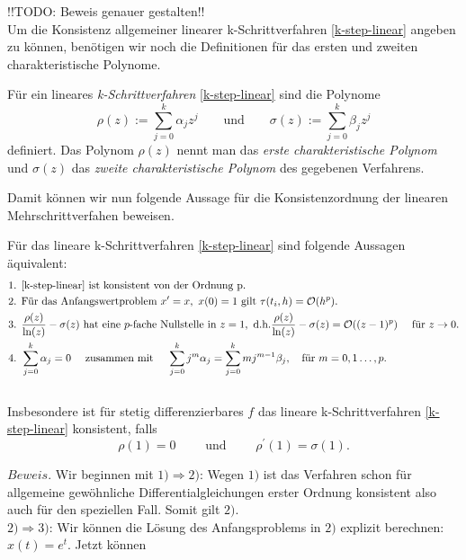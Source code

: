 !!TODO: Beweis genauer gestalten!!\\
Um die Konsistenz allgemeiner linearer k-Schrittverfahren \eqref{k-step-linear} angeben zu können, benötigen wir noch
die Definitionen für das ersten und zweiten charakteristische Polynome.
\begin{definition}
    Für ein lineares \textit{k-Schrittverfahren} \eqref{k-step-linear} sind die Polynome
    \[
        \rho(z) := \sum_{j=0}^{k} \alpha_j z^j \qquad \text{und} \qquad \sigma(z) := \sum_{j=0}^{k} \beta_j z^j
    \]
    definiert. Das Polynom $\rho(z)$ nennt man das {\em erste charakteristische Polynom} und $\sigma(z)$ das
    {\em zweite charakteristische Polynom} des gegebenen Verfahrens.
\end{definition}
Damit können wir nun folgende Aussage für die Konsistenzordnung der linearen Mehrschrittverfahen beweisen.
\begin{satz}
    Für das lineare k-Schrittverfahren \eqref{k-step-linear} sind folgende Aussagen äquivalent:
    \begin{align*}
        &\text{1. } \eqref{k-step-linear} \text{ ist konsistent von der Ordnung p.}\\
        &\text{2. Für das Anfangswertproblem }
            x^{\prime} = x, \text{ }
            x(0) = 1
        \text{ gilt } \tau(t_i,h) = \mathcal{O}(h^p).\\
        &\text{3. } \frac{\rho(z)}{\ln(z)} - \sigma(z) \text{ hat eine $p$-fache Nullstelle in } z= 1, \text{ d.h.}
            \frac{\rho(z)}{\ln(z)} - \sigma(z) = \mathcal{O}((z-1)^p) \quad \text{ für } z \rightarrow 0.\\
        &\text{4. } \sum_{j=0}^{k} \alpha_j = 0 \quad \text{ zusammen mit } \quad
        \sum_{j=0}^{k} j^m \alpha_j = \sum_{j=0}^{k} mj^{m-1} \beta_j,  \quad \text{für } m=0,1 \dots, p.
    \end{align*}\\
    Insbesondere ist für stetig differenzierbares $f$ das lineare k-Schrittverfahren \eqref{k-step-linear} konsistent,
    falls
    \[
        \rho(1) = 0 \qquad \text{ und } \qquad \rho^{\prime}(1)=\sigma(1).
    \]
\end{satz}
$Beweis.$ Wir beginnen mit $1) \Rightarrow 2)$: Wegen $1)$ ist das Verfahren schon für allgemeine gewöhnliche
Differentialgleichungen erster Ordnung konsistent also auch für den speziellen Fall. Somit gilt $2)$.\\
$2) \Rightarrow 3)$: Wir können die Lösung des Anfangsproblems in $2)$ explizit berechnen: $x(t)=e^{t}$. Jetzt können
